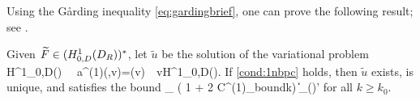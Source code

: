 Using the G\aa rding inequality \cref{eq:gardingbrief}, one can prove the following result; see \cite[Lemma 5.1]{GrPeSp:19}.

\label{lem:H1}
Given $\widetilde{F}\in (H^1_{0,D}(D_{R}))^*$, let $\widetilde{u}$ be the solution of the variational problem
\beqs
{} \,\, \in H^1_{0,D}(\DR) \,\,\tst \,\,
a^{(1)}(,v)=(v) \,\, \tfa v\in H^1_{0,D}(\DR).
\eeqs
If \cref{cond:1nbpc} holds, then $\widetilde{u}$ exists, is unique, and satisfies the bound
\beq\label{eq:bound2}
_{\HokDR} \leq {}\left( 1 + 2 C^{(1)}_{\rm bound}\nsomax  k\right) \big\|\big\|_{(\HokDR)'}
\eeq
for all $k\geq k_0$.
\ele




